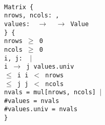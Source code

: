 \begin{myquote}\small{\texttt{\\
\Bsig Matrix \{\\
\TA  nrows, ncols: \Bint,\\
\TA  values: \Bint~$\rightarrow$~\Bint~$\rightarrow$~Value\\
\} \{\\
\TA nrows $\geq$ 0\\
\TA ncols $\geq$ 0\\
\TA \Ball i, j: \Bint~$|$\\
\TB i $\rightarrow$ j \Bin values.univ \Bimplies\\
 $\leq$ i \Band i $<$ nrows \Band\\
 $\leq$ j \Band j $<$ ncols\\
\TA \Blet nvals = mul[nrows, ncols] $|$\\
\TB \#values = nvals \Band\\
\TB \#values.univ = nvals\\
\}
}}
\end{myquote}